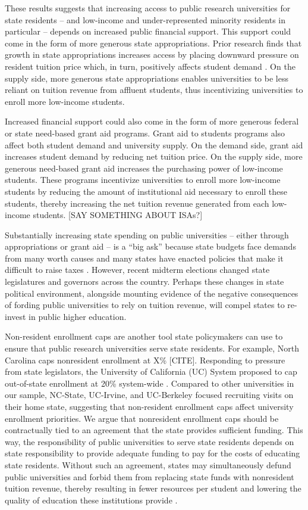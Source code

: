 \documentclass[twoside]{article}
\begin{document}
These results suggests that increasing access to public research universities for state residents -- and low-income and under-represented minority residents in particular -- depends on increased public financial support.  This support could come in the form of more generous state appropriations.  Prior research finds that growth in state appropriations increases access by placing downward pressure on resident tuition price \citep{RN2609} which, in turn, positively affects student demand \citep{RN3068}.  On the supply side, more generous state appropriations enables universities to be less reliant on tuition revenue from affluent students, thus incentivizing universities to enroll more low-income students.

Increased financial support could also come in the form of more generous federal or state need-based grant aid programs.  Grant aid to students programs also affect both student demand and university supply. On the demand side, grant aid increases student demand by reducing net tuition price.  On the supply side, more generous need-based grant aid increases the purchasing power of low-income students. These programs incentivize universities to enroll more low-income students by reducing the amount of institutional aid necessary to enroll these students, thereby increasing the net tuition revenue generated from each low-income students.
[SAY SOMETHING ABOUT ISAs?]

Substantially increasing state spending on public universities -- either through appropriations or grant aid -- is a ``big ask'' because state budgets face demands from many worth causes \citep{RN1652} and many states have enacted policies that make it difficult to raise taxes \citep{RN1646}.  However, recent midterm elections changed state legislatures and governors across the country.  Perhaps these changes in state political environment, alongside mounting evidence of the negative consequences of fording public universities to rely on tuition revenue, will compel states to re-invest in public higher education.

Non-resident enrollment caps are another tool state policymakers can use to ensure that public research universities serve state residents.  For example, North Carolina caps nonresident enrollment at X\% [CITE].  Responding to pressure from state legislators, the  University of California (UC) System proposed to cap out-of-state enrollment at 20\% system-wide \citep{RN4247}.  Compared to other universities in our sample, NC-State, UC-Irvine, and UC-Berkeley focused recruiting visits on their home state, suggesting that non-resident enrollment caps affect university enrollment priorities. We argue that nonresident enrollment caps should be contractually tied to an agreement that the state provides sufficient funding. This way, the responsibility of public universities to serve state residents depends on state responsibility to provide adequate funding to pay for the costs of educating state residents.  Without such an agreement, states may simultaneously defund public universities and forbid them from replacing state funds with nonresident tuition revenue, thereby resulting in fewer resources per student and lowering the quality of education these institutions provide \citep{RN532}.
\end{document}
